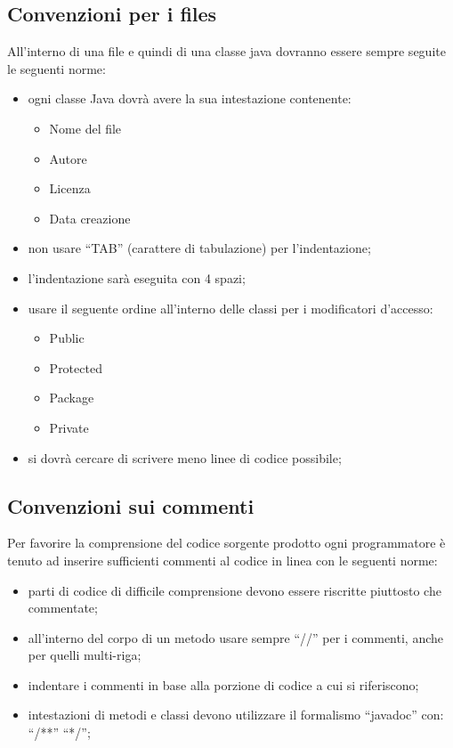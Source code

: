 \subsection{Convenzioni per i files}
All'interno di una file e quindi di una classe java dovranno essere sempre
seguite le seguenti norme: 
\begin{itemize}
  \item ogni classe Java dovr\`a avere la sua intestazione contenente:
    \begin{itemize}
        \item {Nome del file}
        \item {Autore}
        \item {Licenza}
        \item {Data creazione}
    \end{itemize}
  \item non usare ``TAB'' (carattere di tabulazione) per l'indentazione;
  \item l'indentazione sar\`a eseguita con 4 spazi;
  \item usare il seguente ordine all'interno delle classi per i modificatori
  d'accesso:
    \begin{itemize}
        \item {Public}
        \item {Protected}
        \item {Package}
        \item {Private}
    \end{itemize}
  \item si dovr\`a cercare di scrivere meno linee di codice possibile;
\end{itemize}

\subsection{Convenzioni sui commenti}
Per favorire la comprensione del codice sorgente prodotto ogni programmatore \`e
tenuto ad inserire sufficienti commenti al codice in linea con le seguenti
norme:
\begin{itemize}
  \item parti di codice di difficile comprensione devono essere riscritte
  piuttosto che commentate;
  \item all'interno del corpo di un metodo usare sempre ``//'' per i commenti,
  anche per quelli multi-riga;
  \item indentare i commenti in base alla porzione di codice a cui si
  riferiscono;
  \item intestazioni di metodi e classi devono utilizzare il formalismo
  ``javadoc'' con: ``/**'' ``*/'';
\end{itemize}

